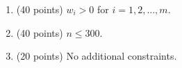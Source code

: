 \begin{enumerate}
    \tightlist
    \item (40 points) $w_i > 0$ for $i = 1, 2, \ldots, m$.
    \item (40 points) $n \leq 300$.
    \item (20 points) No additional constraints.
\end{enumerate}
    